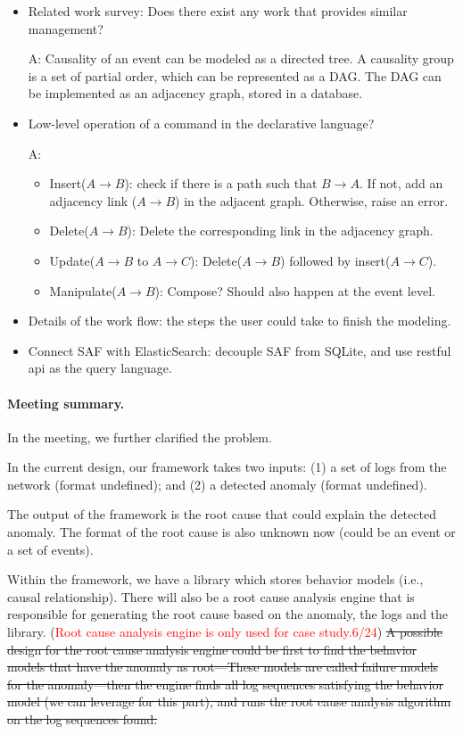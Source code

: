 \documentclass{article}
\begin{document}
\begin{itemize}
\item Related work survey: Does there exist any work that provides similar
  management?

A: Causality of an event can be modeled as a directed tree. A causality group is a set of
partial order, which can be represented as a DAG. The DAG can be implemented as
an adjacency graph, stored in a database.
\item Low-level operation of a command in the declarative language?

A:
\begin{itemize}
\item Insert($A \rightarrow B$): check if there is a path such that $B
  \rightarrow A$. If
not, add an adjacency link ($A \rightarrow B$) in the adjacent
graph. Otherwise, raise an error.
\item Delete($A \rightarrow B$): Delete the corresponding link in the adjacency
  graph.
\item Update($A \rightarrow B$ to $A \rightarrow C$): Delete($A \rightarrow B$)
  followed by insert($A \rightarrow C$).
\item Manipulate($A \rightarrow B$): Compose? Should also happen at the event level.
\end{itemize}

\item Details of the work flow: the steps the user could take to finish the
  modeling.
\item Connect SAF with ElasticSearch: decouple SAF from SQLite, and use restful
  api as the query language.
\end{itemize}

\paragraph{Meeting summary.}
In the meeting, we further clarified the problem.

In the current design, our framework takes two inputs:
(1) a set of logs from the network (format undefined); and
(2) a detected anomaly (format undefined).

The output of the framework is the root cause that could explain the detected
anomaly. The format of the root cause is also unknown now (could be an event or
a set of events). 

Within the framework, we have a library which stores behavior
models (i.e., causal relationship). There will also be a root cause analysis
engine that is responsible
for generating the root cause based on the anomaly, the logs and the
library. 
(\textcolor{red}{Root cause analysis engine is only used for case study.6/24}) 
\sout{A possible design for the root cause analysis engine
could be first to find the behavior models that have the anomaly as root---These
models are called failure models for the anomaly---then the
engine finds all log sequences satisfying the behavior model (we can
leverage \saf{} for this part), and runs the root cause analysis algorithm on
the log sequences found. }
\end{document}
